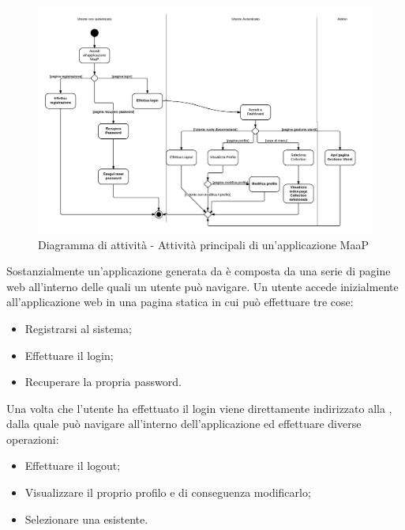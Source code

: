 \begin{figure}[H]
\centering
\includegraphics[scale=0.3]{uml/MaaP - Attivita principali.png}
\caption{Diagramma di attività - Attività principali di un'applicazione MaaP}
\end{figure}

Sostanzialmente un'applicazione generata da  è composta da una serie di pagine web all'interno delle quali un utente può navigare. Un utente accede inizialmente all'applicazione web in una pagina statica in cui può effettuare tre cose:

\begin{itemize}

	\item Registrarsi al sistema;
	\item Effettuare il login;
	\item Recuperare la propria password.

\end{itemize}

Una volta che l'utente ha effettuato il login viene direttamente indirizzato alla , dalla quale può navigare all'interno dell'applicazione ed effettuare diverse operazioni:

\begin{itemize}

	\item Effettuare il logout;
	\item Visualizzare il proprio profilo e di conseguenza modificarlo;
	\item Selezionare una  esistente.

\end{itemize}

